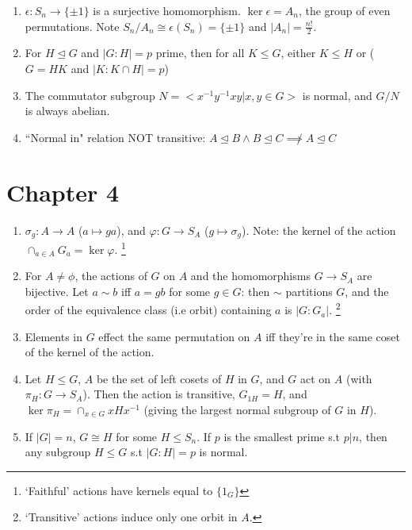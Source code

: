 \documentclass{article}
\newcommand{\normin}{\trianglelefteq}
\begin{document}
\begin{enumerate}[1.]
{            immediately giving $\epsilon(\sigma) = Parity(m-1)$.}
        ) is representation-independent.
    \item $\epsilon : S_n \rightarrow \{\pm 1\}$ is a surjective
        homomorphism. $\ker \epsilon = A_n$, the group of even permutations.
        Note $S_n/A_n \cong \epsilon(S_n) = \{\pm 1\}$ and $|A_n| =
        \frac{n!}{2}$.
    \item For $H \trianglelefteq G$ and $|G : H| = p$ prime, then for all $K
    \leq G$, either $K \leq H$ or ($G = HK$ and $|K:K \cap H| = p$)
    \item The commutator subgroup $N = <x^{-1}y^{-1}xy | x, y \in G>$ is normal,
    and $G/N$ is always abelian.
    \item ``Normal in" relation NOT transitive: $A \normin B \wedge B \normin C
    \not\implies A \normin C$
\end{enumerate}

\section*{Chapter 4}

\begin{enumerate}[1.]
    \item $\sigma_g : A \rightarrow A$ ($a \mapsto ga$), and
        $\varphi : G \rightarrow S_A$ ($g \mapsto \sigma_g$).
        Note: the kernel of the action $\cap_{a \in A} G_a = \ker \varphi$.
        \footnote{`Faithful' actions have kernels equal to $\{1_G\}$}
    \item For $A \not= \phi$, the actions of $G$ on $A$ and the
        homomorphisms $G \rightarrow S_A$ are bijective. Let $a \sim b$ iff $a
        = gb$ for some $g \in G$: then $\sim$ partitions $G$, and the order
        of the equivalence class (i.e orbit) containing $a$ is $|G : G_a|$.
        \footnote{`Transitive' actions induce only one orbit in $A$.}
    \item Elements in $G$ effect the same permutation on $A$ iff they're in
        the same coset of the kernel of the action.
    \item Let $H \leq G$, $A$ be the set of left cosets of $H$ in $G$, and
        $G$ act on $A$ (with $\pi_H : G \rightarrow S_A$). Then the action
        is transitive, $G_{1H} = H$, and $\ker \pi_H = \cap_{x \in G}
        xHx^{-1}$ (giving the largest normal subgroup of $G$ in $H$).
    \item If $|G| = n$, $G \cong H$ for some $H \leq S_n$. If $p$ is the
        smallest prime s.t $p | n$, then any subgroup $H \leq G$ s.t $|G :
        H| = p$ is normal.
\end{enumerate}
\end{document}

